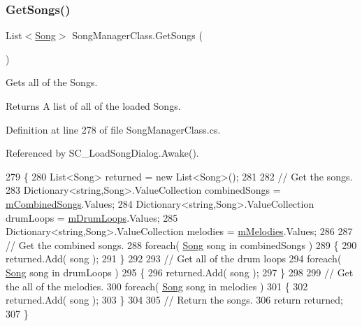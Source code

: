 \subsubsection{\texorpdfstring{Get\+Songs()}{GetSongs()}}
{\footnotesize\ttfamily List$<$\hyperlink{class_song}{Song}$>$ Song\+Manager\+Class.\+Get\+Songs (\begin{DoxyParamCaption}{ }\end{DoxyParamCaption})}



Gets all of the Songs. 

\begin{DoxyReturn}{Returns}
A list of all of the loaded Songs. 
\end{DoxyReturn}


Definition at line 278 of file Song\+Manager\+Class.\+cs.



Referenced by S\+C\+\_\+\+Load\+Song\+Dialog.\+Awake().


\begin{DoxyCode}
279     \{
280         List<Song> returned = \textcolor{keyword}{new} List<Song>();
281 
282         \textcolor{comment}{// Get the songs.}
283         Dictionary<string,Song>.ValueCollection combinedSongs = \hyperlink{group___s_m_priv_var_gaf6b4ff41b8da95d10ad3db62df111faa}{mCombinedSongs}.Values;
284         Dictionary<string,Song>.ValueCollection drumLoops = \hyperlink{group___s_m_priv_var_ga84f25335035755448d11acb9287360f2}{mDrumLoops}.Values;
285         Dictionary<string,Song>.ValueCollection melodies = \hyperlink{group___s_m_priv_var_ga935e80f645d0546003f7df8443b79242}{mMelodies}.Values;
286 
287         \textcolor{comment}{// Get the combined songs.}
288         \textcolor{keywordflow}{foreach}( \hyperlink{class_song}{Song} song \textcolor{keywordflow}{in} combinedSongs )
289         \{
290             returned.Add( song );
291         \}
292 
293         \textcolor{comment}{// Get all of the drum loops}
294         \textcolor{keywordflow}{foreach}( \hyperlink{class_song}{Song} song \textcolor{keywordflow}{in} drumLoops )
295         \{
296             returned.Add( song );
297         \}
298 
299         \textcolor{comment}{// Get the all of the melodies.}
300         \textcolor{keywordflow}{foreach}( \hyperlink{class_song}{Song} song \textcolor{keywordflow}{in} melodies )
301         \{
302             returned.Add( song );
303         \}
304 
305         \textcolor{comment}{// Return the songs.}
306         \textcolor{keywordflow}{return} returned;
307     \}
\end{DoxyCode}
